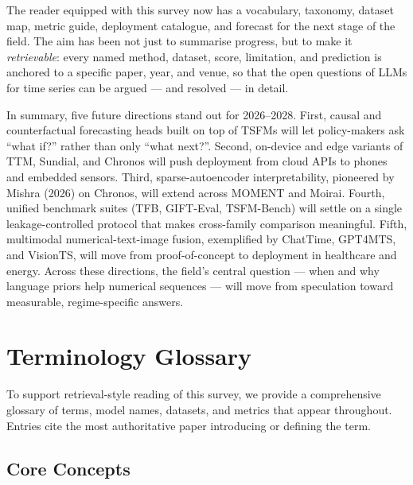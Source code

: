 The reader equipped with this survey now has a vocabulary, taxonomy, dataset map, metric guide, deployment catalogue, and forecast for the next stage of the field. The aim has been not just to summarise progress, but to make it \emph{retrievable}: every named method, dataset, score, limitation, and prediction is anchored to a specific paper, year, and venue, so that the open questions of LLMs for time series can be argued --- and resolved --- in detail.

In summary, five future directions stand out for 2026--2028. First, causal and counterfactual forecasting heads built on top of TSFMs will let policy-makers ask ``what if?'' rather than only ``what next?''. Second, on-device and edge variants of TTM, Sundial, and Chronos will push deployment from cloud APIs to phones and embedded sensors. Third, sparse-autoencoder interpretability, pioneered by Mishra (2026) on Chronos, will extend across MOMENT and Moirai. Fourth, unified benchmark suites (TFB, GIFT-Eval, TSFM-Bench) will settle on a single leakage-controlled protocol that makes cross-family comparison meaningful. Fifth, multimodal numerical-text-image fusion, exemplified by ChatTime, GPT4MTS, and VisionTS, will move from proof-of-concept to deployment in healthcare and energy. Across these directions, the field's central question --- when and why language priors help numerical sequences --- will move from speculation toward measurable, regime-specific answers.

\section{Terminology Glossary}\label{terminology-glossary}

To support retrieval-style reading of this survey, we provide a comprehensive glossary of terms, model names, datasets, and metrics that appear throughout. Entries cite the most authoritative paper introducing or defining the term.

\subsection{Core Concepts}\label{core-concepts}


